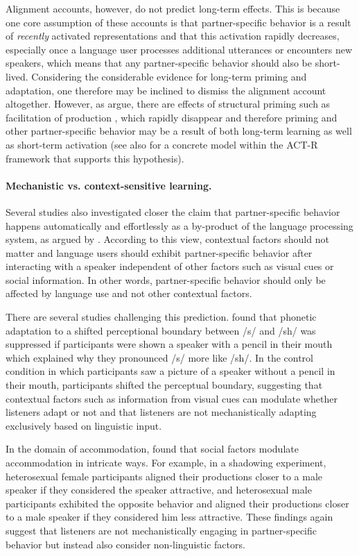  Alignment accounts, however, do not predict long-term effects. This is because one core assumption
of these accounts is that partner-specific behavior is a result of \textit{recently} activated representations and that this activation rapidly decreases, especially once a language user
processes additional utterances or encounters new speakers, which means that any partner-specific behavior should also be short-lived. Considering the considerable evidence 
for long-term priming and adaptation, one therefore may be inclined to dismiss the alignment account altogether. However, as \textcite{Ferreira2006} argue, there are effects of structural priming
such as facilitation of production \cite{Wheeldon2003}, which rapidly disappear and therefore priming and other partner-specific behavior may be a result of both long-term learning as well as 
short-term activation (see also \textcite{Reitter2011} for a concrete model within the ACT-R framework that supports this hypothesis).

\paragraph{Mechanistic vs. context-sensitive learning.} Several studies also investigated closer the claim that partner-specific behavior happens
automatically and effortlessly as a by-product of the language processing system, as argued by \textcite{Pickering2004}. According to this view,
contextual factors should not matter and language users should exhibit partner-specific behavior after interacting with a speaker independent of 
other factors such as visual cues or social information. In other words, partner-specific behavior should only be affected by language use and not
other contextual factors. 

There are several studies challenging this prediction. \textcite{Kraljic2008} found that phonetic adaptation to a shifted perceptional boundary between /s/
and /sh/ was suppressed if participants were shown a speaker with a pencil in their mouth which explained why they pronounced /s/ more like /sh/. In the control
condition in which participants saw a picture of a speaker without a pencil in their mouth, participants shifted the perceptual boundary, suggesting that contextual
factors such as information from visual cues can modulate whether listeners adapt or not and that listeners are not mechanistically adapting exclusively based
on linguistic input.

In the domain of accommodation, \textcite{Babel2012} found that social factors modulate accommodation in intricate ways. For example, in a shadowing experiment, heterosexual female
participants aligned their productions closer to a male speaker if they considered the speaker attractive, and heterosexual male participants exhibited the opposite behavior
and aligned their productions closer to a male speaker if they considered him less attractive. These findings again suggest that listeners are not mechanistically engaging
in partner-specific behavior but instead also consider non-linguistic factors.  

